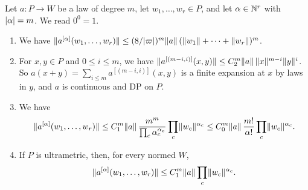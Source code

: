 \begin{theorem}\label{dp:thm:mixed}
Let $a\colon P\to W$ be a law of degree $m$, let $w_1,\dots,w_r\in P$, and let $\alpha\in\mathbb N^r$ with $\lvert \alpha\rvert=m$. We read $0^0=1$.
\begin{enumerate}
\item We have $\lVert a^{[\alpha]}(w_1,\dots,w_r)\rVert\le(8/\lvert \varpi\rvert)^m\lVert a\rVert\,(\lVert w_1\rVert+\dots+\lVert w_r\rVert)^m$.
\item For $x,y\in P$ and $0\le i\le m$, we have $\lVert a^{[(m-i,i)]}(x,y)\rVert\le C_2^m\lVert a\rVert\,\lVert x\rVert^{m-i}\lVert y\rVert^i$. So $a(x+y)=\sum_{i\le m}a^{[(m-i,i)]}(x,y)$ is a finite expansion at $x$ by laws in $y$, and $a$ is continuous and DP on $P$.
\item We have
\begin{equation}\label{dp:laws:scaled}
 \lVert a^{[\alpha]}(w_1,\dots,w_r)\rVert\le C_1^m\lVert a\rVert\,\frac{m^m}{\prod_c\alpha_c^{\alpha_c}}\prod_c\lVert w_c\rVert^{\alpha_c}\le C_0^m\lVert a\rVert\,\frac{m!}{\alpha!}\prod_c\lVert w_c\rVert^{\alpha_c}.
\end{equation}
\item If $P$ is ultrametric, then, for every normed $W$,
\begin{equation}\label{dp:laws:ultrametric}
 \lVert a^{[\alpha]}(w_1,\dots,w_r)\rVert\le C_1^m\lVert a\rVert\prod_c\lVert w_c\rVert^{\alpha_c}.
\end{equation}
\end{enumerate}
\end{theorem}

